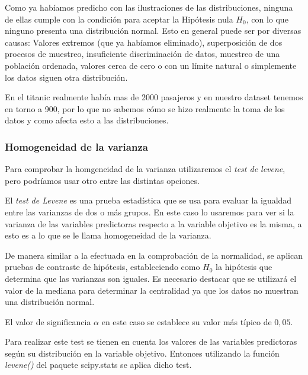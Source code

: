 \documentclass[11pt]{article}
\begin{document}
    Como ya habíamos predicho con las ilustraciones de las distribuciones,
ninguna de ellas cumple con la condición para aceptar la Hipótesis nula
\(H_0\), con lo que ninguno presenta una distribución normal. Esto en
general puede ser por diversas causas: Valores extremos (que ya habíamos
eliminado), superposición de dos procesos de muestreo, insuficiente
discriminación de datos, muestreo de una población ordenada, valores
cerca de cero o con un límite natural o simplemente los datos siguen
otra distribución.

En el titanic realmente había mas de 2000 pasajeros y en nuestro dataset
tenemos en torno a 900, por lo que no sabemos cómo se hizo realmente la
toma de los datos y como afecta esto a las distribuciones.

    \hypertarget{homogeneidad-de-la-varianza}{%
\subsubsection{Homogeneidad de la
varianza}\label{homogeneidad-de-la-varianza}}

Para comprobar la homgeneidad de la varianza utilizaremos el \emph{test
de levene}, pero podríamos usar otro entre las distintas opciones.

El \emph{test de Levene} es una prueba estadística que se usa para
evaluar la igualdad entre las varianzas de dos o más grupos. En este
caso lo usaremos para ver si la varianza de las variables predictoras
respecto a la variable objetivo es la misma, a esto es a lo que se le
llama homogeneidad de la varianza.

De manera similar a la efectuada en la comprobación de la normalidad, se
aplican pruebas de contraste de hipótesis, estableciendo como \(H_0\) la
hipótesis que determina que las varianzas son iguales. Es necesario
destacar que se utilizará el valor de la mediana para determinar la
centralidad ya que los datos no muestran una distribución normal.

El valor de significancia \(\alpha\) en este caso se establece su valor
más típico de \(0,05\).

    Para realizar este test se tienen en cuenta los valores de las variables
predictoras según su distribución en la variable objetivo. Entonces
utilizando la función \emph{levene()} del paquete scipy.stats se aplica
dicho test.
\end{document}
